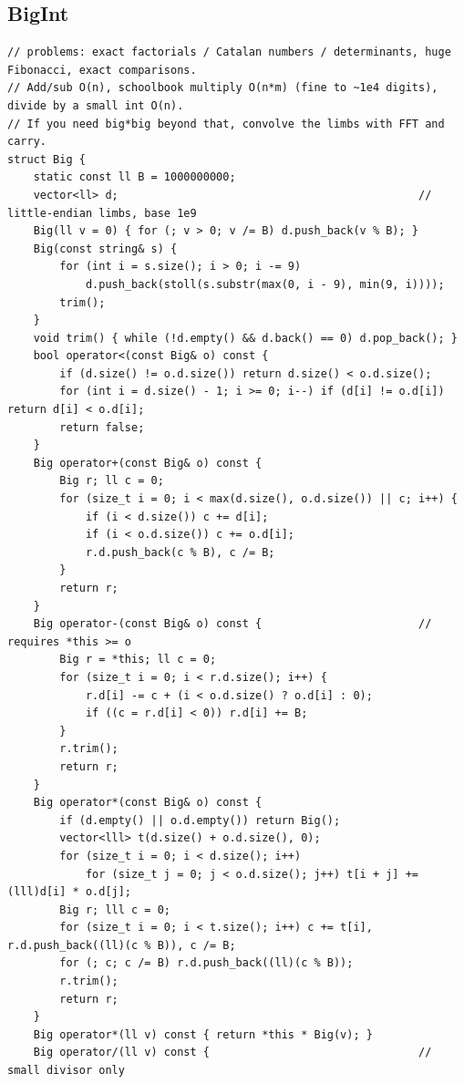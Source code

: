 \documentclass[9pt,a4paper,twocolumn]{extarticle}
\begin{document}
\filbreak
\subsection{BigInt}
\nopagebreak
\begin{lstlisting}
// problems: exact factorials / Catalan numbers / determinants, huge Fibonacci, exact comparisons.
// Add/sub O(n), schoolbook multiply O(n*m) (fine to ~1e4 digits), divide by a small int O(n).
// If you need big*big beyond that, convolve the limbs with FFT and carry.
struct Big {
    static const ll B = 1000000000;
    vector<ll> d;                                              // little-endian limbs, base 1e9
    Big(ll v = 0) { for (; v > 0; v /= B) d.push_back(v % B); }
    Big(const string& s) {
        for (int i = s.size(); i > 0; i -= 9)
            d.push_back(stoll(s.substr(max(0, i - 9), min(9, i))));
        trim();
    }
    void trim() { while (!d.empty() && d.back() == 0) d.pop_back(); }
    bool operator<(const Big& o) const {
        if (d.size() != o.d.size()) return d.size() < o.d.size();
        for (int i = d.size() - 1; i >= 0; i--) if (d[i] != o.d[i]) return d[i] < o.d[i];
        return false;
    }
    Big operator+(const Big& o) const {
        Big r; ll c = 0;
        for (size_t i = 0; i < max(d.size(), o.d.size()) || c; i++) {
            if (i < d.size()) c += d[i];
            if (i < o.d.size()) c += o.d[i];
            r.d.push_back(c % B), c /= B;
        }
        return r;
    }
    Big operator-(const Big& o) const {                        // requires *this >= o
        Big r = *this; ll c = 0;
        for (size_t i = 0; i < r.d.size(); i++) {
            r.d[i] -= c + (i < o.d.size() ? o.d[i] : 0);
            if ((c = r.d[i] < 0)) r.d[i] += B;
        }
        r.trim();
        return r;
    }
    Big operator*(const Big& o) const {
        if (d.empty() || o.d.empty()) return Big();
        vector<lll> t(d.size() + o.d.size(), 0);
        for (size_t i = 0; i < d.size(); i++)
            for (size_t j = 0; j < o.d.size(); j++) t[i + j] += (lll)d[i] * o.d[j];
        Big r; lll c = 0;
        for (size_t i = 0; i < t.size(); i++) c += t[i], r.d.push_back((ll)(c % B)), c /= B;
        for (; c; c /= B) r.d.push_back((ll)(c % B));
        r.trim();
        return r;
    }
    Big operator*(ll v) const { return *this * Big(v); }
    Big operator/(ll v) const {                                // small divisor only

\end{lstlisting}
\end{document}
